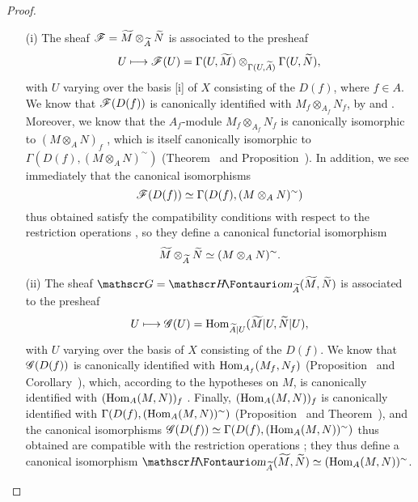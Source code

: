 \begin{proof}
\label{proof-1.1.3.12}
\medskip\noindent
\begin{enumerate}
  \item[(i)] The sheaf $\mathscr{F}=\widetilde{M}\otimes_{\widetilde{A}}\widetilde{N}$ is associated to the presheaf
    \[
      U\mapsto\sh{F}(U)=\Gamma(U,\widetilde{M})\otimes_{\Gamma(U,\widetilde{A})}\Gamma(U,\widetilde{N}),
    \]
    with $U$ varying over the basis [i] of $X$ consisting of the $D(f)$, where $f\in A$.
    We know that $\mathscr{F}(D(f))$ is canonically identified with $M_f\otimes_{A_f}N_f$, by  and .
    Moreover, we know that the $A_f$-module $M_f\otimes_{A_f}N_f$ is canonically
    isomorphic to $(M\otimes_A N)_f$ , which is itself canonically isomorphic to $\Gamma(D(f),(M\otimes_A N)^\sim)$ (Theorem~ and Proposition~).
    In addition, we see immediately that the canonical isomorphisms
    \[
      \mathscr{F}(D(f))\simeq\Gamma(D(f),(M\otimes_A N)^\sim)
    \]
    thus obtained satisfy the compatibility conditions with respect to the restriction operations , so they define a canonical functorial isomorphism
    \[
      \widetilde{M}\otimes_{\widetilde{A}}\widetilde{N}\simeq(M\otimes_A N)^\sim.
    \]
  \item[(ii)] The sheaf $\sh{G}=\shHom_{\widetilde{A}}(\widetilde{M},\widetilde{N})$ is associated to the presheaf
    \[
      U\mapsto\sh{G}(U)=\Hom_{\widetilde{A}|U}(\widetilde{M}|U,\widetilde{N}|U),
    \]
    with $U$ varying over the basis of $X$ consisting of the $D(f)$.
    We know that $\mathscr{G}(D(f))$ is canonically identified with $\operatorname{Hom}_{A_f}(M_f,N_f)$ (Proposition~ and
    Corollary~), which, according to the hypotheses on $M$, is canonically identified with $(\operatorname{Hom}_A(M,N))_f$ .
    Finally, $(\operatorname{Hom}_A(M,N))_f$ is canonically identified with $\Gamma(D(f),(\operatorname{Hom}_A(M,N))^\sim)$ (Proposition~ and Theorem~), and the canonical isomorphisms $\mathscr{G}(D(f))\simeq\Gamma(D(f),(\operatorname{Hom}_A(M,N))^\sim)$ thus obtained are compatible with the restriction operations ;
    they thus define a canonical isomorphism $\shHom_{\widetilde{A}}(\widetilde{M},\widetilde{N})\isoto(\Hom_A(M,N))^\sim$.
\end{enumerate}
\end{proof}

